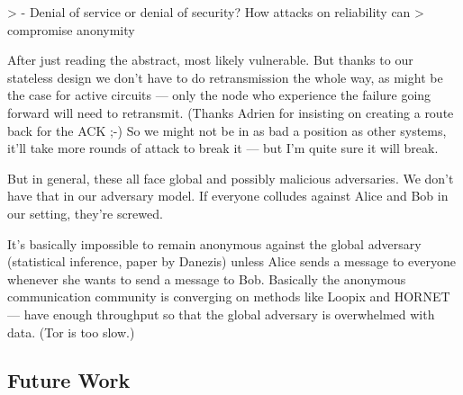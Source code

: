 > - Denial of service or denial of security? How attacks on reliability can
> compromise anonymity

After just reading the abstract, most likely vulnerable. But thanks to 
our stateless design we don't have to do retransmission the whole way, 
as might be the case for active circuits --- only the node who 
experience the failure going forward will need to retransmit. (Thanks Adrien for 
insisting on creating a route back for the ACK ;-) So we might not be in as bad 
a position as other systems, it'll take more rounds of attack to break it --- 
but I'm quite sure it will break.

But in general, these all face global and possibly malicious 
adversaries. We don't have that in our adversary model. If everyone 
colludes against Alice and Bob in our setting, they're screwed.

It's basically impossible to remain anonymous against the global 
adversary (statistical inference, paper by Danezis) unless Alice sends a 
message to everyone whenever she wants to send a message to Bob. 
Basically the anonymous communication community is converging on methods 
like Loopix and HORNET --- have enough throughput so that the global 
adversary is overwhelmed with data. (Tor is too slow.)

\subsection{Future Work}
%


